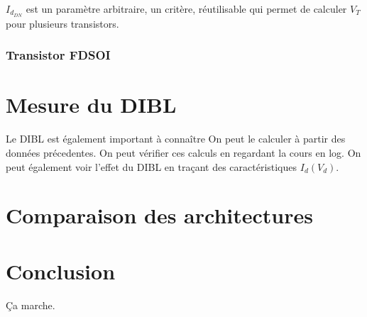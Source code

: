 \documentclass[a4paper,11pt]{report}
\begin{document}
$I_{d_{DN}}$ est un paramètre arbitraire, un critère, réutilisable qui permet de calculer $V_T$ pour plusieurs transistors.

\subsection{Transistor FDSOI}


\chapter{Mesure du DIBL}
Le DIBL est également important à connaître %
On peut le calculer à partir des données précedentes.
On peut vérifier ces calculs en regardant la cours en log.
On peut également voir l'effet du DIBL en traçant des caractéristiques $I_d(V_d)$.

\chapter{Comparaison des architectures}

\chapter*{Conclusion}

Ça marche. %
\end{document}
